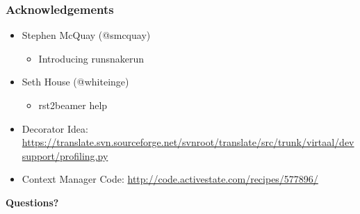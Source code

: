 \documentclass[t,english]{beamer}
\begin{document}
\begin{frame}[fragile]
\frametitle{Acknowledgements}

\begin{itemize}

\item Stephen McQuay (@smcquay)
\begin{itemize}

\item Introducing runsnakerun
\end{itemize}

\item Seth House (@whiteinge)
\begin{itemize}

\item rst2beamer help
\end{itemize}

\item Decorator Idea:
\href{https://translate.svn.sourceforge.net/svnroot/translate/src/trunk/virtaal/devsupport/profiling.py}{https://translate.svn.sourceforge.net/svnroot/translate/src/trunk/virtaal/devsupport/profiling.py}

\item Context Manager Code:
\href{http://code.activestate.com/recipes/577896/}{http://code.activestate.com/recipes/577896/}
\end{itemize}

\textbf{Questions?}
\end{frame}
\end{document}
